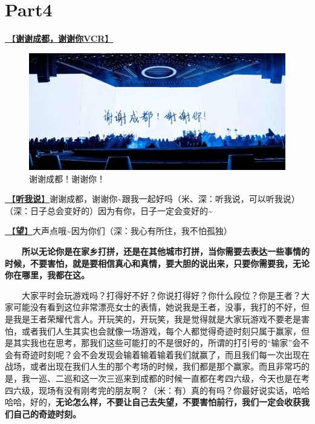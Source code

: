 \documentclass[]{ctexbook}
\begin{document}
\section{Part4}\label{chengdu-20240615-part4}

\hyperref[thank-you-vcr]{🎥【\textbf{谢谢成都，谢谢你VCR}】}

\begin{figure}

{\centering \includegraphics[width=400pt]{img/chengdu20240615/thank-chengdu} 

}

\caption{谢谢成都！谢谢你！}\label{fig:unnamed-chunk-54}
\end{figure}

\hyperref[listen-to-me]{🎵【\textbf{听我说}】}谢谢成都，谢谢你\textasciitilde 跟我一起好吗（米、深：听我说，可以听我说）（深：日子总会变好的）因为有你，日子一定会变好的\textasciitilde{}

\hyperref[Gaze]{🎵【\textbf{望}】}大声点哦\textasciitilde 因为你们（深：我心有所住，我不怕孤独）

  \textbf{所以无论你是在家乡打拼，还是在其他城市打拼，当你需要去表达一些事情的时候，不要害怕，就是要相信真心和真情，要大胆的说出来，只要你需要我，无论你在哪里，我都在这。}

  大家平时会玩游戏吗？打得好不好？你说打得好？你什么段位？你是王者？大家可能没有看到这位非常漂亮女士的表情，她说我是王者，没事，我打的不好，但是我是王者荣耀代言人。开玩笑的，开玩笑，我是觉得就是大家玩游戏不要老是害怕，或者我们人生其实也会就像一场游戏，每个人都觉得奇迹时刻只属于赢家，但是其实我也在思考，那我们这些可能打的不是很好的，所谓的打引号的``输家''会不会有奇迹时刻呢？会不会发现会输着输着输着我们就赢了，而且我们每一次出现在战场，或者出现在我们人生的那个考场的时候，我们都是那个赢家。而且非常巧的是，我一巡、二巡和这一次三巡来到成都的时候一直都在考四六级，今天也是在考四六级，现场有没有刚考完的朋友啊？（米：有）真的有吗？你最好说实话，哈哈哈哈，好的，\textbf{无论怎么样，不要让自己去失望，不要害怕前行，我们一定会收获我们自己的奇迹时刻。}
\end{document}
